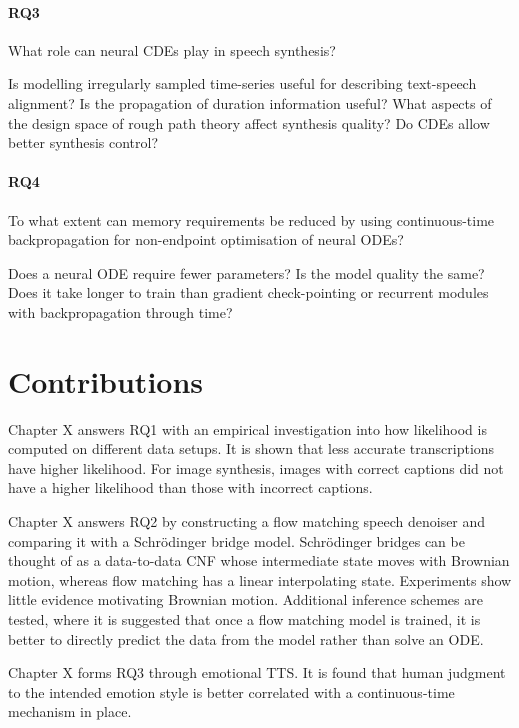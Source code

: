\paragraph{RQ3}
What role can neural \acp{CDE} play in speech synthesis?

Is modelling irregularly sampled time-series useful for describing text-speech alignment? Is the propagation of duration information useful? What aspects of the design space of rough path theory affect synthesis quality? Do \acp{CDE} allow better synthesis control?


\paragraph{RQ4}
To what extent can memory requirements be reduced by using continuous-time backpropagation for non-endpoint optimisation of neural \acp{ODE}?

Does a neural \ac{ODE} require fewer parameters? Is the model quality the same? Does it take longer to train than gradient check-pointing or recurrent modules with backpropagation through time?

\section{Contributions}

Chapter X answers RQ1 with an empirical investigation into how likelihood is computed on different data setups. It is shown that less accurate transcriptions have higher likelihood. For image synthesis, images with correct captions did not have a higher likelihood than those with incorrect captions.

Chapter X answers RQ2 by constructing a flow matching speech denoiser and comparing it with a Schr\"odinger bridge model. Schr\"odinger bridges can be thought of as a data-to-data \ac{CNF} whose intermediate state moves with Brownian motion, whereas flow matching has a linear interpolating state. Experiments show little evidence motivating Brownian motion. Additional inference schemes are tested, where it is suggested that once a flow matching model is trained, it is better to directly predict the data from the model rather than solve an \ac{ODE}.

Chapter X forms RQ3 through emotional \ac{TTS}. It is found that human judgment to the intended emotion style is better correlated with a continuous-time mechanism in place.


